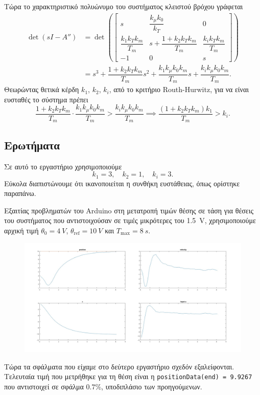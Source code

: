 \documentclass[12pt]{article}
\begin{document}
Τώρα το χαρακτηριστικό πολυώνυμο του συστήματος κλειστού βρόχου γράφεται
\begin{align*}
    \det(sI - A'') &= \det\left(  \begin{bmatrix}
        s & \dfrac{k_\mu k_0}{k_T } & 0 \\
        \dfrac{k_ 1 k_T k_m }{T_m } & s + \dfrac{1 + k_2 k_T k_m}{T_m} & \dfrac{k_i k_T k_m }{T_m } \\
        -1 & 0 & s
\end{bmatrix}\right) \\
    &= s^3 + \dfrac{1 + k_2 k_T k_m}{T_m} s^2 + \dfrac{k_1 k_\mu k_0 k_m }{T_m } s + \dfrac{k_i k_\mu k_0 k_m }{T_m }.
\end{align*} 
Θεωρώντας θετικά κέρδη \(k_1\), \(k_2\), \(k_i \), από το κριτήριο Routh-Hurwitz, για να είναι ευσταθές το σύστημα πρέπει 
\begin{equation*}
    \dfrac{1 + k_2 k_T k_m}{T_m} \cdot \dfrac{k_1 k_\mu k_0 k_m }{T_m } > \dfrac{k_i k_\mu k_0 k_m }{T_m } \implies 
    \dfrac{(1 + k_2 k_T k_m) k_1 }{T_m} > k_i.
\end{equation*} 

\subsection*{Ερωτήματα}
Σε αυτό το εργαστήριο χρησιμοποιούμε
\begin{equation*}
    k_1 = 3, \quad k_2 = 1, \quad k_i = 3.
\end{equation*}
Εύκολα διαπιστώνουμε ότι ικανοποιείται η συνθήκη ευστάθειας, όπως ορίστηκε παραπάνω. 

Εξαιτίας προβληματών του Arduino στη μετατροπή τιμών θέσης σε τάση για θέσεις του συστήματος που αντιστοιχούσαν σε τιμές μικρότερες του \SI{1.5}{V}, χρησιμοποιούμε αρχική τιμή \(\theta_0 = \SI{4}{V }\), \(\theta_\text{ref} = \SI{10}{V }\) και \(T_\text{max} = \SI{8}{s }\). 
\begin{figure}[H]
    \centering
    \includegraphics*[scale=0.25]{lab3_all_lay22.jpg}
\end{figure}
Τώρα τα σφάλματα που είχαμε στο δεύτερο εργαστήριο σχεδόν εξαλείφονται. Τελευταία τιμή που μετρήθηκε για τη θέση είναι η \texttt{positionData(end) = 9.9267} που αντιστοιχεί σε σφάλμα \(0.7\%\), υποδιπλάσιο των προηγούμενων. 
\end{document}
